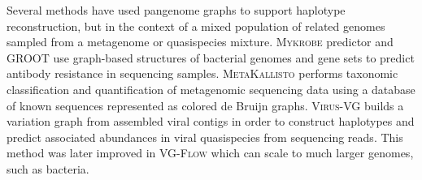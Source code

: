 Several methods have used pangenome graphs to support haplotype reconstruction, but in the context of a mixed population of related genomes sampled from a metagenome or quasispecies mixture.
\textsc{Mykrobe} predictor \cite{Bradley2015-kl} and \textsc{GROOT} \cite{Rowe2018-bg} use graph-based structures of bacterial genomes and gene sets to predict antibody resistance in sequencing samples.
\textsc{MetaKallisto} \cite{Schaeffer2017-fh} performs taxonomic classification and quantification of metagenomic sequencing data using a database of known sequences represented as colored de Bruijn graphs.
\textsc{Virus-VG} \cite{Baaijens2019-ng} builds a variation graph from assembled viral contigs in order to construct haplotypes and predict associated abundances in viral quasispecies from sequencing reads.
This method was later improved in \textsc{VG-Flow} \cite{Baaijens2019-ha} which can scale to much larger genomes, such as bacteria.  






